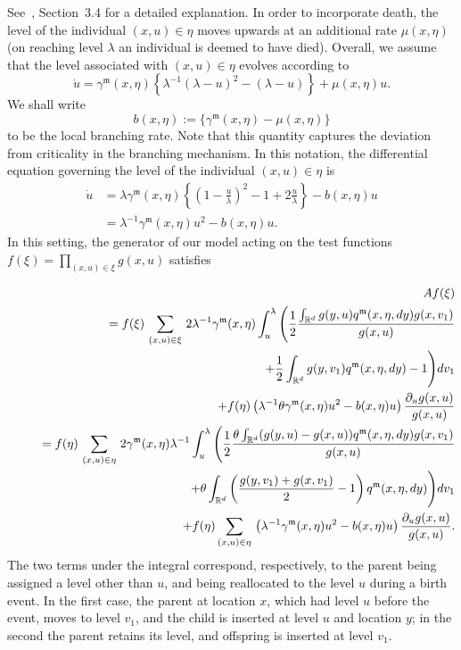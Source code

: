 \documentclass[12pt]{article}
\def \non{{\nonumber}}
\begin{document}
See~\cite{etheridge/kurtz:2018}, Section~3.4 for a detailed explanation.
In order to incorporate death,
the level of the individual $(x,u)\in \eta$ 
moves upwards at an additional rate
$ \mu(x,\eta)$
(on reaching level $\lambda$
an individual is deemed to have died).
Overall, we assume that
the level associated with $(x,u)\in\eta$
evolves according to
$$\dot{u}= \gamma^{\mathfrak{m}}(x, \eta) 
\left\{\lambda^{-1}(\lambda -u)^{2}
-(\lambda -u)\right\}+\mu(x,\eta)u.$$
We shall write 
$$b(x,\eta):= \big\{\gamma^{\mathfrak{m}}(x,\eta)
-\mu(x,\eta)\big\}$$
to be the local branching rate.
Note that this quantity captures
the deviation from criticality
in the branching mechanism.
In this notation,
the differential equation 
governing the level of the individual $(x,u)\in\eta$ is
\begin{align}
\dot{u}&=\lambda  \gamma^{\mathfrak{m}}(x,\eta) 
\left\{\left(1-\frac{u}{\lambda}\right)^{2}
-1 +2\frac{u}{\lambda}\right\} -b(x,\eta)u \nonumber \\
&=\lambda^{-1}  \gamma^{\mathfrak{m}}(x,\eta) u^2 -b(x,\eta)u. \label{differential equation for level}
\end{align}
In this setting, the generator of our model
acting on the test functions $f(\xi)=\prod_{(x,u) \in \xi}g(x,u)$
satisfies

\begin{eqnarray}\label{Generator of prelimit simplest model}
&&Af(\xi ) \nonumber \\
&&\quad =f(\xi )\,\sum_{(x,u)\in\xi}\,2\lambda^{-1} \gamma^{\mathfrak{m}}(x, \eta)
\int_u^{
\lambda}\Bigg(\frac 12\frac {\int_{\mathbb{R}^d}g(y,u)q^{\mathfrak{m}}(x,\eta,d
y)g(x,v_1)}{g(x,u)} \label{multgen3}\\
&&\qquad\qquad\qquad\qquad\qquad\qquad\qquad\qquad\qquad\qquad
+\frac 12\int_{\mathbb{R}^d}g(y,v_1)q^{\mathfrak{m}}(x,\eta ,dy)-
1\Bigg)dv_1\nonumber\\
&&\quad \quad +f(\eta )\left(\lambda^{-1} \theta \gamma^{\mathfrak{m}}(x,\eta) u^2 -b(x,\eta)u\right)\frac {\partial_u g(x,u)}{g(x,u)}\nonumber\\
&&\quad =f(\eta )\,\sum_{(x,u)\in\eta}\,2 \gamma^{\mathfrak{m}}(x, \eta)\lambda^{-1}\int_u^{
\lambda}\Bigg(\frac 12\frac {\theta\int_{\mathbb{R}^d}(g(y,u)-g(x,u))q^{\mathfrak{m}}(x,\eta,dy)g(x,v_1)}{g(x,u)}\non\\
&&\qquad\qquad\qquad\qquad\qquad\qquad\qquad +\theta\int_{\mathbb{R}^d}\left(\frac{g(y,v_1)+g(x,v_1)}{2}-1\right)q^{\mathfrak{m}}(x,\eta,dy)\Bigg)dv_1\nonumber\\
&&\qquad\qquad
+f(\eta )\sum_{(x,u)\in\eta}\,\left(\lambda^{-1} \gamma^{\mathfrak{m}}(x,\eta) u^2 -b(x,\eta)u\right)\frac {\partial_u g(x,u)}{g(x,u)}.\nonumber
\end{eqnarray}
The two terms under the integral correspond, respectively,
to the parent being assigned a level other than $u$,
and being reallocated to the level $u$
during a birth event.
In the first case, the parent at location $x$,
which had level $u$ before the event,
moves to level $v_1$,
and the child is inserted at level $u$
and location $y$;
in the second the parent retains its level,
and offspring is inserted at level $v_1$.
\end{document}
